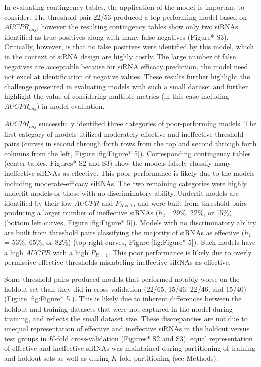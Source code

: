 \documentclass{report}
\begin{document}
 In evaluating contingency tables, the application of the model is important to consider. The threshold pair 22/53 produced a top performing model based on $AUCPR_{adj}$, however the resulting contingency tables show only two siRNAs identified as true positives along with many false negatives (Figure* S3). Critically, however, is that no false positives were identified by this model, which in the context of siRNA design are highly costly. The large number of false negatives are acceptable because for siRNA efficacy prediction, the model need not excel at identification of negative values. These results further highlight the challenge presented in evaluating models with such a small dataset and further highlight the value of considering multiple metrics (in this case including $AUCPR_{adj}$) in model evaluation.

 $AUCPR_{adj}$ successfully identified three categories of poor-performing models. The first category of models utilized moderately effective and ineffective threshold pairs (curves in second through forth rows from the top and second through forth columns from the left, Figure \ref{fig:Figure* 5}). Corresponding contingency tables (center tables, Figures* S2 and S3) show the models falsely classify many ineffective siRNAs as effective. This poor performance is likely due to the models including moderate-efficacy siRNAs. The two remaining categories were highly underfit models or those with no discriminatory ability. Underfit models are identified by their low $AUCPR$ and $P_{R=1}$, and were built from threshold pairs producing a larger number of ineffective siRNAs ($h_2$= 29\%, 22\%, or 15\%) (bottom left curves, Figure \ref{fig:Figure* 5}). Models with no discriminatory ability are built from threshold pairs classifying the majority of siRNAs as effective ($h_1$ = 53\%, 65\%, or 82\%) (top right curves, Figure \ref{fig:Figure* 5}). Such models have a high $AUCPR$ with a high $P_{R=1}$. This poor performance is likely due to overly permissive effective thresholds mislabeling ineffective siRNAs as effective.

 Some threshold pairs produced models that performed notably worse on the holdout set than they did in cross-validation (22/65, 15/46, 22/46, and 15/40) (Figure \ref{fig:Figure* 5}). This is likely due to inherent differences between the holdout and training datasets that were not captured in the model during training, and reflects the small dataset size. These discrepancies are not due to unequal representation of effective and ineffective siRNAs in the holdout versus test groups in $K$-fold cross-validation (Figures* S2 and S3); equal representation of effective and ineffective siRNAs was maintained during partitioning of training and holdout sets as well as during $K$-fold partitioning (see Methods). 
\end{document}
